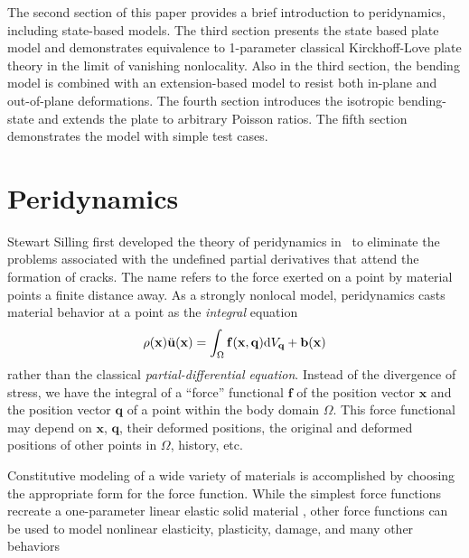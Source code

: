 \documentclass[preprint,review,12pt]{elsarticle}
\newcommand{\mathbi}[1]{\mathit{\mathbf{#1}}}
\begin{document}
The second section of this paper provides a brief introduction to peridynamics, including state-based models.  The third section presents the state based plate model and demonstrates equivalence to 1-parameter classical Kirckhoff-Love plate theory in the limit of vanishing nonlocality.  Also in the third section, the bending model is combined with an extension-based model to resist both in-plane and out-of-plane deformations.  The fourth section introduces the isotropic bending-state and extends the plate to arbitrary Poisson ratios.  The fifth section demonstrates the model with simple test cases.

%
\section{Peridynamics}
\label{sec:PDintro}
Stewart Silling first developed the theory of peridynamics in~\cite{silling2000reformulation} to eliminate the problems associated with the undefined partial derivatives that attend the formation of cracks. The name refers to the force exerted on a point by material points a finite distance away. As a strongly nonlocal model, peridynamics casts material behavior at a point as the \textit{integral} equation 
%
\begin{equation}
    \label{eq:PDCoPV}
    \rho(\mathbf{x})\ddot{\mathbf{u}}(\mathbf{x}) = \int_\Omega \mathbi{f}(\mathbf{x},\mathbf{q}) {\rm d}V_\mathbf{q}  + \mathbf{b}(\mathbf{x}) \notag
\end{equation}
%
rather than the classical \textit{partial-differential equation}.  Instead of the divergence of stress, we have the integral of a ``force'' functional $\mathbi{f}$ of the position vector $\mathbf{x}$ and the position vector $\mathbf{q}$ of a point within the body domain $\Omega$.  This force functional may depend on \(\mathbf{x}\), \(\mathbf{q}\), their deformed positions, the original and deformed positions of other points in \(\Omega\), history, etc.

Constitutive modeling of a wide variety of materials is accomplished by choosing the appropriate form for the force function.  While the simplest force functions recreate a one-parameter linear elastic solid material \cite{silling2000reformulation}, other force functions can be used to model nonlinear elasticity, plasticity, damage, and many other behaviors \cite{silling2005peridynamic, dayal2006kinetics, gerstle2007peridynamic, silling2007peridynamic, warren2009non, foster2010viscoplasticity,foster2011energy,taylor2013two,ogrady2014beams}
\end{document}
